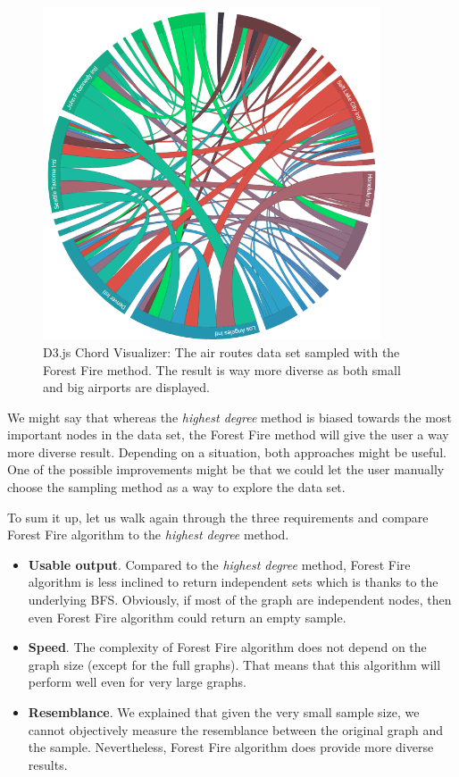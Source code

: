 \begin{figure}
	\centering
	\includegraphics[width=100mm]{img/07_chord_forest_fire}
	\caption{D3.js Chord Visualizer: The air routes data set sampled with the Forest Fire method. The result is way more diverse as both small and big airports are displayed.}
    \label{fig:chord-forest-fire}
\end{figure}

We might say that whereas the \emph{highest degree} method is biased towards the most important nodes in the data set, the Forest Fire method will give the user a way more diverse result. Depending on a situation, both approaches might be useful. One of the possible improvements might be that we could let the user manually choose the sampling method as a way to explore the data set.

To sum it up, let us walk again through the three requirements and compare Forest Fire algorithm to the \emph{highest degree} method.

\begin{itemize}
\item \textbf{Usable output}. Compared to the \emph{highest degree} method, Forest Fire algorithm is less inclined to return independent sets which is thanks to the underlying BFS. Obviously, if most of the graph are independent nodes, then even Forest Fire algorithm could return an empty sample.
\item \textbf{Speed}. The complexity of Forest Fire algorithm does not depend on the graph size (except for the full graphs). That means that this algorithm will perform well even for very large graphs.
\item \textbf{Resemblance}. We explained that given the very small sample size, we cannot objectively measure the resemblance between the original graph and the sample. Nevertheless, Forest Fire algorithm does provide more diverse results.
\end{itemize}

